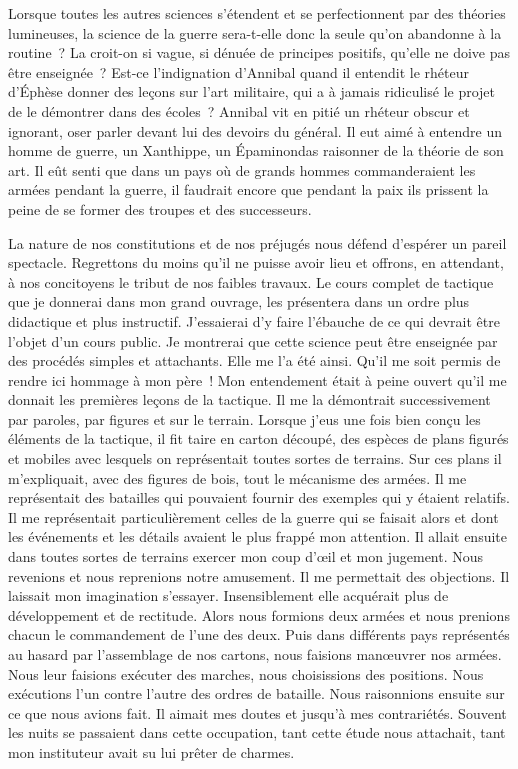 \documentclass[french,twoside]{book} %
\begin{document}
Lorsque toutes les autres sciences s’étendent et se perfectionnent par des théories lumineuses, la science de la guerre sera-t-elle donc la seule qu’on abandonne à la routine ? La croit-on si vague, si dénuée de principes positifs, qu’elle ne doive pas être enseignée ? Est-ce l’indignation d’Annibal quand il entendit le rhéteur d’Éphèse donner des leçons sur l’art militaire, qui a à jamais ridiculisé le projet de le démontrer dans des écoles ? Annibal vit en pitié un rhéteur obscur et ignorant, oser parler devant lui des devoirs du général. Il eut aimé à entendre un homme de guerre, un Xanthippe, un Épaminondas raisonner de la théorie de son art. Il eût senti que dans un pays où de grands hommes commanderaient les armées pendant la guerre, il faudrait encore que pendant la paix ils prissent la peine de se former des troupes et des successeurs.\par
La nature de nos constitutions et de nos préjugés nous défend d’espérer un pareil spectacle. Regrettons du moins qu’il ne puisse avoir lieu et offrons, en attendant, à nos concitoyens le tribut de nos faibles travaux. Le cours complet de tactique que je donnerai dans mon grand ouvrage, les présentera dans un ordre plus didactique et plus instructif. J’essaierai d’y faire l’ébauche de ce qui devrait être l’objet d’un cours public. Je montrerai que cette science peut être enseignée par des procédés simples et attachants. Elle me l’a été ainsi. Qu’il me soit permis de rendre ici hommage à mon père ! Mon entendement était à peine ouvert qu’il me donnait les premières leçons de la tactique. Il me la démontrait successivement par paroles, par figures et sur le terrain. Lorsque j’eus une fois bien conçu les éléments de la tactique, il fit taire en carton découpé, des espèces de plans figurés et mobiles avec lesquels on représentait toutes sortes de terrains. Sur ces plans il m’expliquait, avec des figures de bois, tout le mécanisme des armées. Il me représentait des batailles qui pouvaient fournir des exemples qui y étaient relatifs. Il me représentait particulièrement celles de la guerre qui se faisait alors et dont les événements et les détails avaient le plus frappé mon attention. Il allait ensuite dans toutes sortes de terrains exercer mon coup d’œil et mon jugement. Nous revenions et nous reprenions notre amusement. Il me permettait des objections. Il laissait mon imagination s’essayer. Insensiblement elle acquérait plus de développement et de rectitude. Alors nous formions deux armées et nous prenions chacun le commandement de l’une des deux. Puis dans différents pays représentés au hasard par l’assemblage de nos cartons, nous faisions manœuvrer nos armées. Nous leur faisions exécuter des marches, nous choisissions des positions. Nous exécutions l’un contre l’autre des ordres de bataille. Nous raisonnions ensuite sur ce que nous avions fait. Il aimait mes doutes et jusqu’à mes contrariétés. Souvent les nuits se passaient dans cette occupation, tant cette étude nous attachait, tant mon instituteur avait su lui prêter de charmes.
\end{document}
